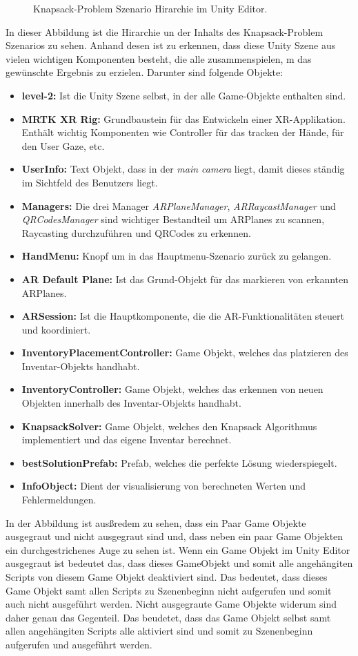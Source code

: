 \begin{itemize}
\begin{figure}[H]
    \caption{Knapsack-Problem Szenario Hirarchie im Unity Editor.}
    \label{fig:level2_hierarchy}
\end{figure}
In dieser Abbildung ist die Hirarchie un der Inhalts des Knapsack-Problem Szenarios zu sehen. Anhand desen ist zu erkennen,
dass diese Unity Szene aus vielen wichtigen Komponenten besteht, die alle zusammenspielen, m das gewünschte Ergebnis
zu erzielen. Darunter sind folgende Objekte:
\begin{itemize}
    \item \textbf{level-2:} Ist die Unity Szene selbst, in der alle Game-Objekte enthalten sind.
    \item \textbf{MRTK XR Rig:} Grundbaustein für das Entwickeln einer XR-Applikation. Enthält wichtig Komponenten
    wie Controller für das tracken der Hände, für den User Gaze, etc.
    \item \textbf{UserInfo:} Text Objekt, dass in der \textit{main camera } liegt, damit dieses ständig im Sichtfeld des
    Benutzers liegt.
    \item \textbf{Managers:} Die drei Manager \textit{ARPlaneManager}, \textit{ARRaycastManager} und \textit{QRCodesManager}
    sind wichtiger Bestandteil um ARPlanes zu scannen, Raycasting durchzuführen und QRCodes zu erkennen.
    \item \textbf{HandMenu:} Knopf um in das Hauptmenu-Szenario zurück zu gelangen.
    \item \textbf{AR Default Plane:} Ist das Grund-Objekt für das markieren von erkannten ARPlanes.
    \item \textbf{ARSession:} Ist die Hauptkomponente, die die AR-Funktionalitäten steuert und koordiniert.
    \item \textbf{InventoryPlacementController:} Game Objekt, welches das platzieren des Inventar-Objekts handhabt.
    \item \textbf{InventoryController:} Game Objekt, welches das erkennen von neuen Objekten innerhalb des Inventar-Objekts handhabt.
    \item \textbf{KnapsackSolver:} Game Objekt, welches den Knapsack Algorithmus implementiert und das eigene Inventar berechnet.
    \item \textbf{bestSolutionPrefab:} Prefab, welches die perfekte Lösung wiederspiegelt.
    \item \textbf{InfoObject:} Dient der visualisierung von berechneten Werten und Fehlermeldungen.
\end{itemize}

In der Abbildung ist ausßredem zu sehen, dass ein Paar Game Objekte ausgegraut und nicht ausgegraut sind und, dass neben ein paar Game Objekten ein durchgestrichenes Auge zu sehen ist.
Wenn ein Game Objekt im Unity Editor ausgegraut ist bedeutet das, dass dieses GameObjekt und somit alle angehängiten Scripts von diesem Game Objekt deaktiviert sind.
Das bedeutet, dass dieses Game Objekt samt allen Scripts zu Szenenbeginn nicht aufgerufen und somit auch nicht ausgeführt werden. Nicht ausgegraute Game Objekte widerum sind
daher genau das Gegenteil. Das beudetet, dass das Game Objekt selbst samt allen angehängiten Scripts alle aktiviert sind und somit zu Szenenbeginn aufgerufen und ausgeführt werden.


\end{itemize}
